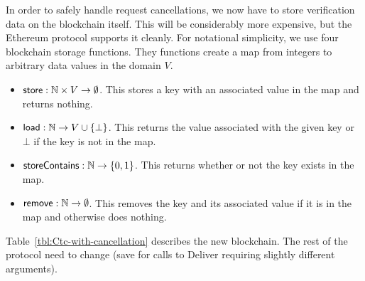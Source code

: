 In order to safely handle request cancellations, we now have to store verification data on the blockchain itself.
This will be considerably more expensive, but the Ethereum protocol supports it cleanly.
For notational simplicity, we use four blockchain storage functions.
They functions create a map from integers to arbitrary data values in the domain $V$.
\begin{itemize}
  \item {${\sf store} : \mathbb{N} \times V \to \emptyset$.}
    This stores a key with an associated value in the map and returns nothing.

  \item {${\sf load} : \mathbb{N} \to V \cup \{\bot\}$.}
    This returns the value associated with the given key or $\bot$ if the key is not in the map.

  \item {${\sf storeContains} : \mathbb{N} \to \{0, 1\}$.}
    This returns whether or not the key exists in the map.

  \item {${\sf remove} : \mathbb{N} \to \emptyset$.}
    This removes the key and its associated value if it is in the map and otherwise does nothing.
\end{itemize}
Table~\ref{tbl:Ctc-with-cancellation} describes the new \tcont blockchain.
The rest of the protocol need to change (save for calls to Deliver requiring slightly different arguments).

